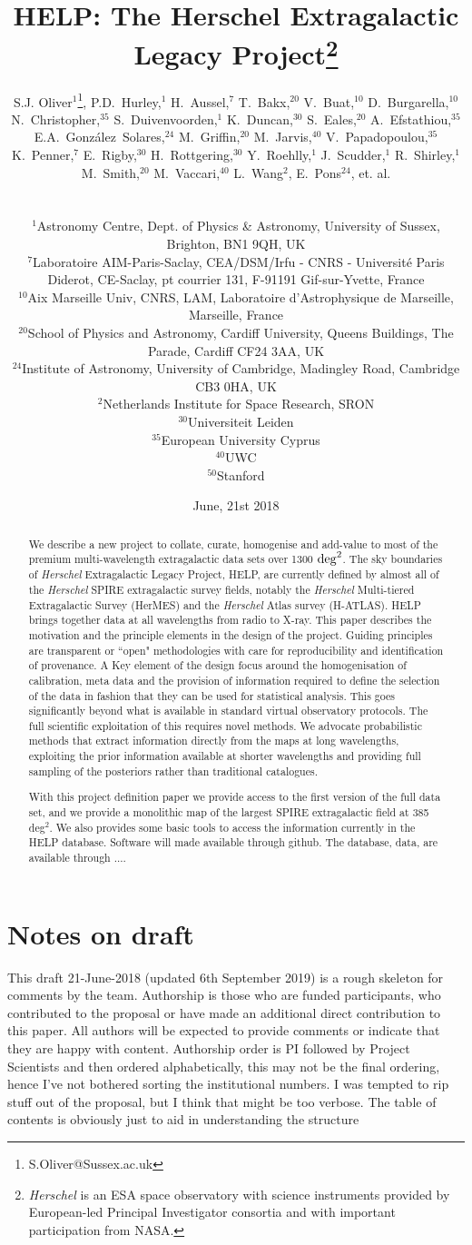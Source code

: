 \documentclass[usenatbib]{mnras}
\title[HELP: The Herschel Extragalactic Legacy Project]{HELP: The Herschel
  Extragalactic Legacy Project\footnote{{\em Herschel} is an ESA space
  observatory with science instruments provided by European-led Principal
Investigator consortia and with important participation from NASA.}}
\date{June, 21st 2018}
\author[S. J. Oliver et al.]
{
  \parbox{\textwidth}
  {\raggedright S.J. Oliver$^{1}$\thanks{S.Oliver@Sussex.ac.uk},
  P.D.~Hurley,$^{1}$
  H.~Aussel,$^{7}$
  T.~Bakx,$^{20}$
  V.~Buat,$^{10}$
  D.~Burgarella,$^{10}$
  N.~Christopher,$^{35}$
  S.~Duivenvoorden,$^{1}$
  K.~Duncan,$^{30}$
  S.~Eales,$^{20}$
  A.~Efstathiou,$^{35}$
  E.A.~Gonz\'alez~Solares,$^{24}$
  M.~Griffin,$^{20}$
  M.~Jarvis,$^{40}$
  V.~Papadopoulou,$^{35}$
  K.~Penner,$^{7}$
  E.~Rigby,$^{30}$
  H.~Rottgering,$^{30}$
  Y.~Roehlly,$^{1}$
  J.~Scudder,$^{1}$
  R.~Shirley,$^{1}$
  M.~Smith,$^{20}$
  M.~Vaccari,$^{40}$
  L.~Wang$^{2}$,
  E.~Pons$^{24}$,
  et. al.
}
\vspace{0.4cm}\\
\parbox{\textwidth}
{\raggedright
  $^{1}$Astronomy Centre, Dept. of Physics \& Astronomy, University of Sussex,
  Brighton, BN1 9QH, UK\\
  $^{7}$Laboratoire AIM-Paris-Saclay, CEA/DSM/Irfu - CNRS - Universit\'e Paris
  Diderot, CE-Saclay, pt courrier 131, F-91191 Gif-sur-Yvette, France\\
  $^{10}$Aix Marseille Univ, CNRS, LAM, Laboratoire d'Astrophysique de Marseille, 
Marseille, France\\
  $^{20}$School of Physics and Astronomy, Cardiff University, Queens Buildings,
  The Parade, Cardiff CF24 3AA, UK\\
  $^{24}$Institute of Astronomy, University of Cambridge, Madingley Road,
  Cambridge CB3 0HA, UK\\
  $^{2}$Netherlands Institute for Space Research, SRON\\
  $^{30}$Universiteit Leiden\\
  $^{35}$European University Cyprus\\
  $^{40}$UWC\\
  $^{50}$Stanford\\
}}
\newcommand{\Herschel}{\textit{Herschel} }
\begin{document}
\maketitle


\section*{Notes on draft}

{\color{red} This draft 21-June-2018 (updated 6th September 2019) is a rough skeleton for comments by the
team.  Authorship is those who are funded participants, who contributed to the
proposal or have made an additional direct contribution to this paper. All
authors will be expected to provide comments or indicate that they are happy
with content. Authorship order is PI followed by Project Scientists and then
ordered  alphabetically, this may not be the final ordering, hence I've not
bothered sorting the institutional numbers. I was tempted to rip stuff out of
the proposal, but I think that might be too verbose. The table of contents is
obviously just to aid in understanding the structure}

\setcounter{tocdepth}{3}\tableofcontents


\begin{abstract}
  We describe a new project to collate, curate, homogenise and add-value to most 
  of the premium multi-wavelength extragalactic data sets over 1300 ${\rm
  deg}^2$. The sky boundaries of \Herschel Extragalactic Legacy Project, HELP,  are currently defined by almost all of the \Herschel SPIRE extragalactic survey fields,
  notably the \Herschel Multi-tiered Extragalactic Survey (HerMES) and the
  \Herschel Atlas survey (H-ATLAS). HELP brings together data at all wavelengths
  from radio to X-ray.  This paper describes the motivation and the principle
  elements in the design of the project. Guiding principles are transparent or ``open" methodologies with care for reproducibility and identification of provenance. A Key element of the design focus
  around the homogenisation of calibration, meta data and the provision of
  information required to define the selection of the data in fashion that 
  they can be used for statistical analysis. This goes significantly beyond what is available in standard virtual observatory protocols. The full
  scientific exploitation of this requires novel methods.  We  advocate
  probabilistic methods that extract information directly from the maps at long
  wavelengths, exploiting the prior information available at shorter wavelengths
  and providing full sampling of the posteriors rather than traditional
  catalogues. 


  With this project definition paper we provide access to the first version of the full data set, and we provide a monolithic map of the largest SPIRE extragalactic
  field at 385 deg$^2$. We also provides some basic tools to access the
  information currently in the HELP database.   Software will made available
  through github.  The database, data, are available through ....
\end{abstract}
\end{document}
